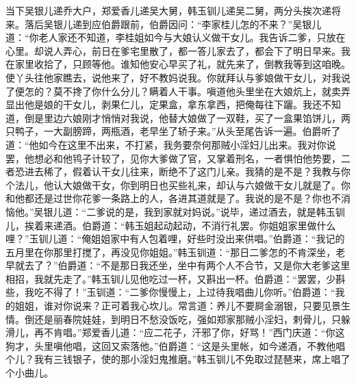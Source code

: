 当下吴银儿递乔大户，郑爱香儿递吴大舅，韩玉钏儿递吴二舅，两分头挨次递将来。落后吴银儿递到应伯爵跟前，伯爵因问：“李家桂儿怎的不来？”吴银儿道：“你老人家还不知道，李桂姐如今与大娘认义做干女儿。我告诉二爹，只放在心里。却说人弄心，前日在爹宅里散了，都一答儿家去了，都会下了明日早来。我在家里收拾了，只顾等他。谁知他安心早买了礼，就先来了，倒教我等到这咱晚。使丫头往他家瞧去，说他来了，好不教妈说我。你就拜认与爹娘做干女儿，对我说了便怎的？莫不搀了你什么分儿？瞒着人干事。嗔道他头里坐在大娘炕上，就卖弄显出他是娘的干女儿，剥果仁儿，定果盒，拿东拿西，把俺每往下躧。我还不知道，倒是里边六娘刚才悄悄对我说，他替大娘做了一双鞋，买了一盒果馅饼儿，两只鸭子，一大副膀蹄，两瓶酒，老早坐了轿子来。”从头至尾告诉一遍。伯爵听了道：“他如今在这里不出来，不打紧，我务要奈何那贼小淫妇儿出来。我对你说罢，他想必和他鸨子计较了，见你大爹做了官，又掌着刑名，一者惧怕他势要，二者恐进去稀了，假着认干女儿往来，断绝不了这门儿亲。我猜的是不是？我教与你个法儿，他认大娘做干女，你到明日也买些礼来，却认与六娘做干女儿就是了。你和他都还是过世你花爹一条路上的人，各进其道就是了。我说的是不是？你也不消恼他。”吴银儿道：“二爹说的是，我到家就对妈说。”说毕，递过酒去，就是韩玉钏儿，挨着来递酒。伯爵道：“韩玉姐起动起动，不消行礼罢。你姐姐家里做什么哩？”玉钏儿道：“俺姐姐家中有人包着哩，好些时没出来供唱。”伯爵道：“我记的五月里在你那里打搅了，再没见你姐姐。”韩玉钏道：“那日二爹怎的不肯深坐，老早就去了？”伯爵道：“不是那日我还坐，坐中有两个人不合节，又是你大老爹这里相招，我就先走了。”韩玉钏儿见他吃过一杯，又斟出一杯。伯爵道：“罢罢，少斟些，我吃不得了！”玉钏道：“二爹你慢慢上，上过待我唱曲儿你听。”伯爵道：“我的姐姐，谁对你说来？正可着我心坎儿。常言道：养儿不要屙金溺银，只要见景生情。倒还是丽春院娃娃，到明日不愁没饭吃，强如郑家那贼小淫妇，\textShouWai 剌骨儿，只躲滑儿，再不肯唱。”郑爱香儿道：“应二花子，汗邪了你，好骂！”西门庆道：“你这狗才，头里嗔他唱，这回又索落他。”伯爵道：“这是头里帐，如今递酒，不教他唱个儿？我有三钱银子，使的那小淫妇鬼推磨。”韩玉钏儿不免取过琵琶来，席上唱了个小曲儿。

